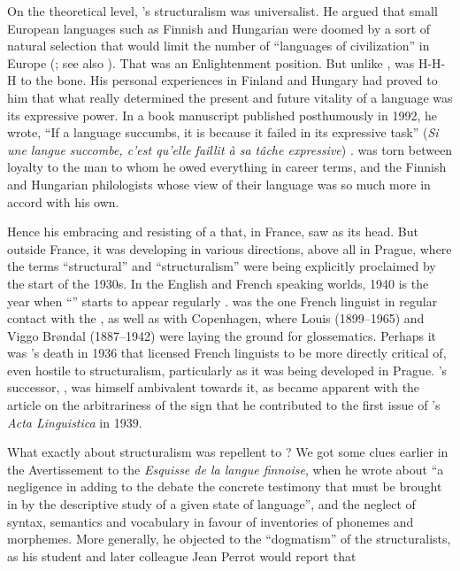 \documentclass[output=paper]{langscibook}
\begin{document}
On the theoretical level, {\Meillet}'s structuralism was universalist. He argued that small European languages such as Finnish and Hungarian were doomed by a sort of natural selection that would limit the number of ``languages of civilization'' in Europe (\citealt[279]{Meillet1918}; see also \citealt[209--210]{Sauvageot2013}). That was an Enlightenment position. But unlike {\Meillet}, {\Sauvageot} was H-H-H to the bone. His personal experiences in Finland and Hungary had proved to him that what really determined the present and future vitality of a language was its expressive power. In a book manuscript published posthumously in 1992, he wrote, ``If a language succumbs, it is because it failed in its expressive task'' (\emph{Si une langue succombe, c'est qu'elle faillit à sa tâche expressive}) \citep[160]{Sauvageot1992}. {\Sauvageot} was torn between loyalty to the man to whom he owed everything in career terms, and the Finnish and Hungarian philologists whose view of their language was so much more in accord with his own.

Hence his embracing and resisting of a  that, in France, saw {\Meillet} as its head. But outside France, it was developing in various directions, above all in Prague, where the terms ``structural'' and ``structuralism'' were being explicitly proclaimed by the start of the 1930s. In the English and French speaking worlds, 1940 is the year when ``'' starts to appear regularly \citep[see][]{Joseph2015}. {\Martinet} was the one French linguist in regular contact with the {\PragueLinguisticCircle}, as well as with Copenhagen, where Louis {\Hjelmslev} (1899--1965) and Viggo Brøndal (1887--1942) were laying the ground for glossematics. Perhaps it was {\Meillet}'s death in 1936 that licensed French linguists to be more directly critical of, even hostile to structuralism, particularly as it was being developed in Prague. {\Meillet}'s successor, {\Benveniste}, was himself ambivalent towards it, as became apparent with the article on the arbitrariness of the sign that he contributed to the first issue of {\Hjelmslev}'s \emph{Acta Linguistica} in 1939.

What exactly about structuralism was repellent to {\Sauvageot}? We got some clues earlier in the Avertissement to the \emph{Esquisse de la langue finnoise}, when he wrote about ``a negligence in adding to the debate the concrete testimony that must be brought in by the descriptive study of a given state of language'', and the neglect of syntax, semantics and vocabulary in favour of inventories of phonemes and morphemes. More generally, he objected to the ``dogmatism'' of the structuralists, as his student and later colleague Jean Perrot would report that
\end{document}
